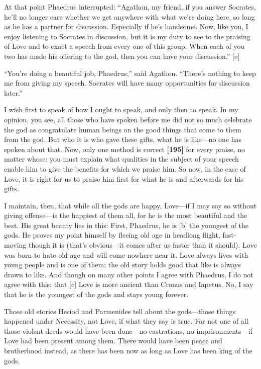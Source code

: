 At that point Phaedrus interrupted: “Agathon, my friend, if you answer
Socrates, he'll no longer care whether we get anywhere with what we're
doing here, so long as he has a partner for discussion. Especially if
he's handsome. Now, like you, I enjoy listening to Socrates in
discussion, but it is my duty to see to the praising of Love and to
exact a speech from every one of this group. When each of you two has
made his offering to the god, then you can have your discussion.”
{[}e{]}

“You're doing a beautiful job, Phaedrus,” said Agathon. “There's nothing
to keep me from giving my speech. Socrates will have many opportunities
for discussion later.”\crlf
\crlf

I wish first to speak of how I ought to speak, and only then to speak.
In my opinion, you see, all those who have spoken before me did not so
much celebrate the god as congratulate human beings on the good things
that come to them from the god. But who it is who gave these gifts, what
he is like---no one has spoken about that. Now, only one method is
correct {\bf {[}195{]}} for every praise, no matter whose: you must
explain what qualities in the subject of your speech enable him to give
the benefits for which we praise him. So now, in the case of Love, it is
right for us to praise him first for what he is and afterwards for his
gifts.

I maintain, then, that while all the gods are happy, Love---if I may say
so without giving offense---is the happiest of them all, for he is the
most beautiful and the best. His great beauty lies in this: First,
Phaedrus, he is {[}b{]} the youngest of the
gods. He proves my
point himself by fleeing old age in headlong flight, fast-moving though
it is (that's obvious---it comes after us faster than it should). Love
was born to hate old age and will come nowhere near it. Love always
lives with young people and is one of them: the old story holds good
that like is always drawn to like. And though on many other points I
agree with Phaedrus, I do not agree with this: that {[}c{]} Love is more
ancient than Cronus and Iapetus. No, I say that he is the youngest of
the gods and stays young forever.

Those old stories Hesiod and Parmenides tell about the gods---those
things happened under Necessity, not Love, if what they say is true. For
not one of all those violent deeds would have been done---no
castrations, no imprisonments---if Love had been present among them.
There would have been peace and brotherhood instead, as there has been
now as long as Love has been king of the gods.

